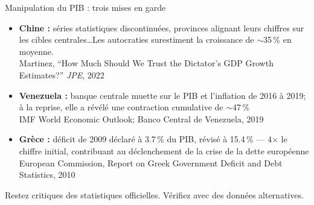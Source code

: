 \documentclass[aspectratio=169]{beamer}
\begin{document}
\begin{frame}[t]{Manipulation du PIB : trois mises en garde}
   \small
   \begin{itemize}
      \setlength\itemsep{0.1cm}
      \item \textbf{Chine :} séries statistiques discontinuées, provinces alignant leurs chiffres sur les cibles centrales\ldots Les autocraties surestiment la croissance de $\sim$35\,\% en moyenne.
         \\{\scriptsize\textcolor{HECgray}{Martinez, ``How Much Should We Trust the Dictator's GDP Growth Estimates?'' \textit{JPE}, 2022}}
      \item \textbf{Venezuela :} banque centrale muette sur le PIB et l'inflation de 2016 à 2019; à la reprise, elle a révélé une contraction cumulative de $\sim$47\,\%
         \\{\scriptsize\textcolor{HECgray}{IMF World Economic Outlook; Banco Central de Venezuela, 2019}}
      \item \textbf{Grèce :} déficit de 2009 déclaré à 3.7\,\% du PIB, révisé à 15.4\,\% --- 4$\times$ le chiffre initial, contribuant au déclenchement de la crise de la dette européenne
         \\{\scriptsize\textcolor{HECgray}{European Commission, Report on Greek Government Deficit and Debt Statistics, 2010}}
   \end{itemize}
   \begin{bizimplication}
      \footnotesize Restez critiques des statistiques officielles. Vérifiez avec des données alternatives.
   \end{bizimplication}
\end{frame}
\end{document}
